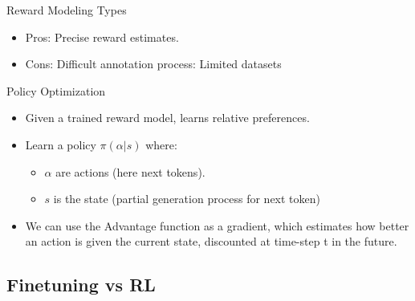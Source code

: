 \documentclass[24pt]{beamer}
\newcommand{\subsectionslide}{
	\begin{frame}
		\sectionpage
		\subsectionpage
	\end{frame}
}
\begin{document}
\begin{frame}{Reward Modeling Types}
{\begin{itemize}
			\item Pros: Precise reward estimates.
			\item Cons: Difficult annotation process: Limited datasets
		\end{itemize}
	}
\end{frame}

\begin{frame}{Policy Optimization}
	\begin{itemize}
		\item Given a trained reward model, learns relative preferences.
		\item Learn a policy $\pi(\alpha \lvert s)$ where:
		\begin{itemize}
			\item $\alpha$ are actions (here next tokens).
			\item $s$ is the state (partial generation process for next token)
		\end{itemize}
		\item We can use the \alert{Advantage} function as a gradient, which estimates how better an action is given the current state, discounted at time-step t  in the future.
	\end{itemize}
\end{frame}


\subsection{Finetuning vs RL}
\subsectionslide
\end{document}
